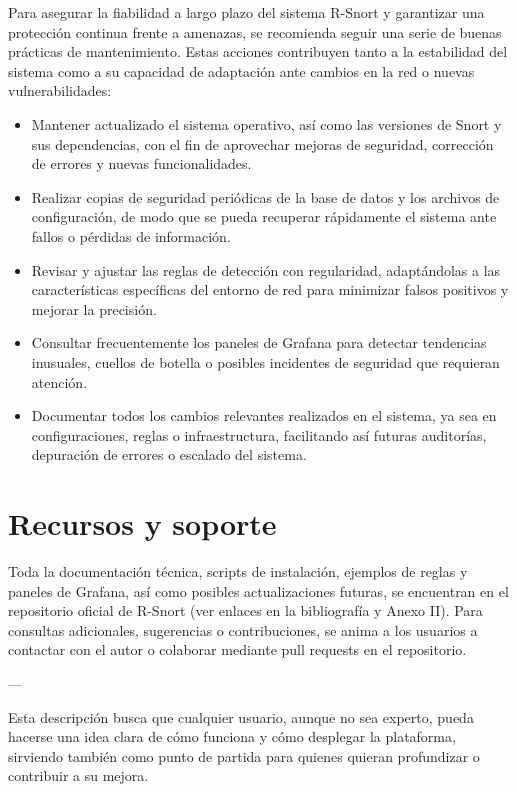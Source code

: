 \documentclass[11pt,a4paper,twoside]{report}
\begin{document}
Para asegurar la fiabilidad a largo plazo del sistema R-Snort y garantizar una protección continua frente a amenazas, se recomienda seguir una serie de buenas prácticas de mantenimiento. Estas acciones contribuyen tanto a la estabilidad del sistema como a su capacidad de adaptación ante cambios en la red o nuevas vulnerabilidades:

\begin{itemize}
	\item Mantener actualizado el sistema operativo, así como las versiones de Snort y sus dependencias, con el fin de aprovechar mejoras de seguridad, corrección de errores y nuevas funcionalidades.
	
	\item Realizar copias de seguridad periódicas de la base de datos y los archivos de configuración, de modo que se pueda recuperar rápidamente el sistema ante fallos o pérdidas de información.
	
	\item Revisar y ajustar las reglas de detección con regularidad, adaptándolas a las características específicas del entorno de red para minimizar falsos positivos y mejorar la precisión.
	
	\item Consultar frecuentemente los paneles de Grafana para detectar tendencias inusuales, cuellos de botella o posibles incidentes de seguridad que requieran atención.
	
	\item Documentar todos los cambios relevantes realizados en el sistema, ya sea en configuraciones, reglas o infraestructura, facilitando así futuras auditorías, depuración de errores o escalado del sistema.
\end{itemize}

\section{Recursos y soporte}

Toda la documentación técnica, scripts de instalación, ejemplos de reglas y paneles de Grafana, así como posibles actualizaciones futuras, se encuentran en el repositorio oficial de R-Snort (ver enlaces en la bibliografía y Anexo II). Para consultas adicionales, sugerencias o contribuciones, se anima a los usuarios a contactar con el autor o colaborar mediante pull requests en el repositorio.

---

Esta descripción busca que cualquier usuario, aunque no sea experto, pueda hacerse una idea clara de cómo funciona y cómo desplegar la plataforma, sirviendo también como punto de partida para quienes quieran profundizar o contribuir a su mejora.
\end{document}
